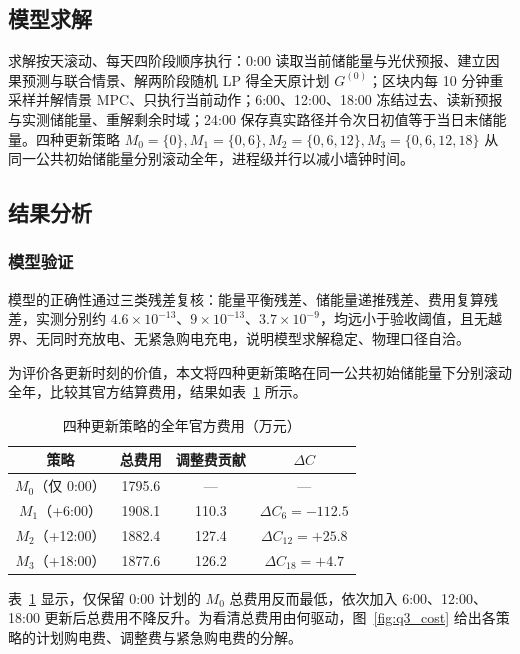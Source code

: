 \subsection{模型求解}

求解按天滚动、每天四阶段顺序执行：0:00 读取当前储能量与光伏预报、建立因果预测与联合情景、解两阶段随机 LP 得全天原计划 $G^{(0)}$；区块内每 10 分钟重采样并解情景 MPC、只执行当前动作；6:00、12:00、18:00 冻结过去、读新预报与实测储能量、重解剩余时域；24:00 保存真实路径并令次日初值等于当日末储能量。四种更新策略 $M_0=\{0\},M_1=\{0,6\},M_2=\{0,6,12\},M_3=\{0,6,12,18\}$ 从同一公共初始储能量分别滚动全年，进程级并行以减小墙钟时间。

\subsection{结果分析}

\subsubsection{模型验证}

模型的正确性通过三类残差复核：能量平衡残差、储能量递推残差、费用复算残差，实测分别约 $4.6\times10^{-13}$、$9\times10^{-13}$、$3.7\times10^{-9}$，均远小于验收阈值，且无越界、无同时充放电、无紧急购电充电，说明模型求解稳定、物理口径自洽。

为评价各更新时刻的价值，本文将四种更新策略在同一公共初始储能量下分别滚动全年，比较其官方结算费用，结果如表~\ref{tab:cost3} 所示。

\begin{table}[htbp]
\centering
\caption{四种更新策略的全年官方费用（万元）}
\label{tab:cost3}
\begin{tabular}{cccc}
\toprule
策略 & 总费用 & 调整费贡献 & $\Delta C$ \\
\midrule
$M_0$（仅 0:00） & 1795.6 & --- & --- \\
$M_1$（+6:00） & 1908.1 & 110.3 & $\Delta C_6=-112.5$ \\
$M_2$（+12:00） & 1882.4 & 127.4 & $\Delta C_{12}=+25.8$ \\
$M_3$（+18:00） & 1877.6 & 126.2 & $\Delta C_{18}=+4.7$ \\
\bottomrule
\end{tabular}
\end{table}

表~\ref{tab:cost3} 显示，仅保留 0:00 计划的 $M_0$ 总费用反而最低，依次加入 6:00、12:00、18:00 更新后总费用不降反升。为看清总费用由何驱动，图~\ref{fig:q3_cost} 给出各策略的计划购电费、调整费与紧急购电费的分解。

